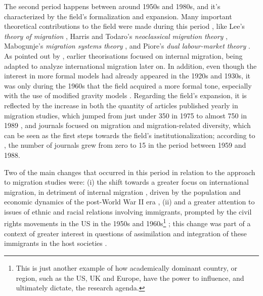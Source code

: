 The second period happens between around 1950s and 1980s, and it's characterized by the field's formalization and expansion. Many important theoretical contributions to the field were made during this period \citep{massey_theories_1993, de_haas_theory_2021}, like Lee’s \textit{theory of migration} \citep{lee_theory_1966}, Harris and Todaro’s \textit{neoclassical migration theory} \citep{todaro_model_1969, harris_migration_1970}, Mabogunje's \textit{migration systems theory} \citep{mabogunje_systems_1970}, and Piore’s \textit{dual labour-market theory} \citep{piore_birds_1979}. As pointed out by \cite{king_mind_2010}, earlier theorisations focused on internal migration, being adapted to analyze international migration later on. In addition, even though the interest in more formal models had already appeared in the 1920s and 1930s, it was only during the 1960s that the field acquired a more formal tone, especially with the use of modified gravity models \citep{greenwood_early_2003}. Regarding the field's expansion, it is reflected by the increase in both the quantity of articles published yearly in migration studies, which jumped from just under 350 in 1975 to almost 750 in 1989 \citep{levy_between_2020, scholten_introduction_2022}, and journals focused on migration and migration-related diversity, which can be seen as the first steps towards the field's institutionalization; according to \cite{pisarevskaya_mapping_2020}, the number of journals grew from zero to 15 in the period between 1959 and 1988. 

Two of the main changes that occurred in this period in relation to the approach to migration studies were: (i) the shift towards a greater focus on international migration, in detriment of internal migration \citep{scholten_introduction_2022}, driven by the population and economic dynamics of the post-World War II era \citep{castles_migration_2014}, (ii) and a greater attention to issues of ethnic and racial relations involving immigrants, prompted by the civil rights movements in the US in the 1950s and 1960s\footnote{This is just another example of how academically dominant country, or region, such as the US, UK and Europe, have the power to influence, and ultimately dictate, the research agenda.} \citep{portes_immigrant_1978, pedraza-bailey_immigration_1990}; this change was part of a context of greater interest in questions of assimilation and integration of these immigrants in the host societies \citep{scholten_introduction_2022}.

